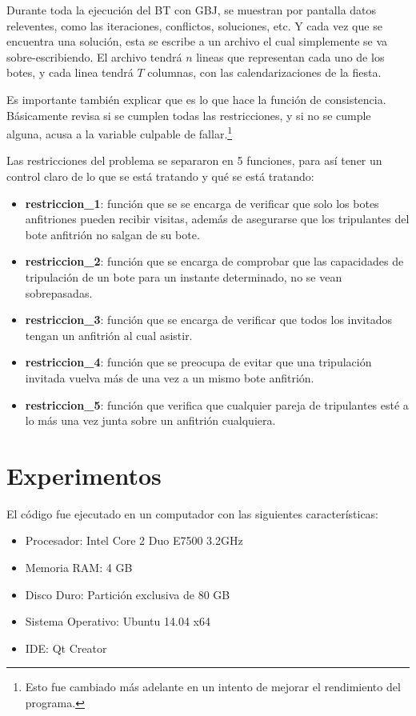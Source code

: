 \documentclass[letter, 10pt]{article}
\begin{document}
Durante toda la ejecución del BT con GBJ, se muestran por pantalla datos releventes, como las iteraciones, conflictos, soluciones, etc. Y cada vez que se encuentra una solución, esta se escribe a un archivo el cual simplemente se va sobre-escribiendo. El archivo tendrá $n$ lineas que representan cada uno de los botes, y cada linea tendrá $T$ columnas, con las calendarizaciones de la fiesta.

Es importante también explicar que es lo que hace la función de consistencia. Básicamente revisa si se cumplen todas las restricciones, y si no se cumple alguna, acusa a la variable culpable de fallar.\footnote{Esto fue cambiado más adelante en un intento de mejorar el rendimiento del programa.}

Las restricciones del problema se separaron en 5 funciones, para así tener un control claro de lo que se está tratando y qué se está tratando:

\begin{itemize}
\item \textbf{restriccion\_1}: función que se se encarga de verificar que solo los botes anfitriones pueden recibir visitas, además de asegurarse que los tripulantes del bote anfitrión no salgan de su bote.

\item \textbf{restriccion\_2}: función que se encarga de comprobar que las capacidades de tripulación de un bote para un instante determinado, no se vean sobrepasadas.

\item \textbf{restriccion\_3}: función que se encarga de verificar que todos los invitados tengan un anfitrión al cual asistir.

\item \textbf{restriccion\_4}: función que se preocupa de evitar que una tripulación invitada vuelva más de una vez a un mismo bote anfitrión.

\item \textbf{restriccion\_5}: función que verifica que cualquier pareja de tripulantes esté a lo más una vez junta sobre un anfitrión cualquiera.
\end{itemize}

\section{Experimentos}
El código fue ejecutado en un computador con las siguientes características:

\begin{itemize}
\item Procesador: Intel Core 2 Duo E7500 3.2GHz
\item Memoria RAM: 4 GB
\item Disco Duro: Partición exclusiva de 80 GB
\item Sistema Operativo: Ubuntu 14.04 x64
\item IDE: Qt Creator
\end{itemize}
\end{document}

